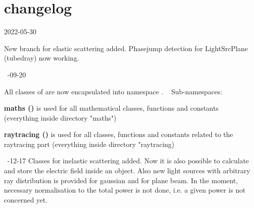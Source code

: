 \chapter{changelog}
\hypertarget{md_changelog}{}\label{md_changelog}
2022-\/05-\/30 

New branch for elastic scattering added. Phasejump detection for Light\+Src\+Plane (tubedray) now working. 

~-\/09-\/20 

All classes of  are now encapsulated into namespace . ~\newline
 Sub-\/namespaces\+: ~\newline
 
\begin{DoxyItemize}
\item {\bfseries{maths ()}} is used for all mathematical classes, functions and constants (everything inside directory "{}maths"{})  
\item {\bfseries{raytracing ()}} is used for all classes, functions and constants related to the raytracing part (everything inside directory "{}raytracing)  
\end{DoxyItemize}

~-\/12-\/17 Classes for inelastic scattering added. Now it is also possible to calculate and store the electric field inside an object. Also new light sources with arbitrary ray distribution is provided for gaussian and for plane beam. In the moment, necessary normalisation to the total power is not done, i.\+e. a given power is not concerned yet. 